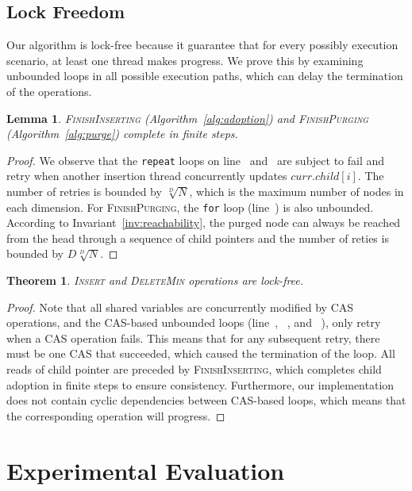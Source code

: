 \documentclass[10pt,journal,letterpaper,compsoc]{IEEEtran}
\newtheorem{theorem}{Theorem}
\newtheorem{lemma}{Lemma}
\begin{document}
\subsection{Lock Freedom}
Our algorithm is lock-free because it guarantee that for every possibly execution scenario, at least one thread makes progress.
We prove this by examining unbounded loops in all possible execution paths, which can delay the termination of the operations.
\begin{lemma} \label{lmm:finitestep}
    \textsc{FinishInserting} (Algorithm~\ref{alg:adoption}) and \textsc{FinishPurging} (Algorithm~\ref{alg:purge}) complete in finite steps.
\end{lemma}
\begin{proof}
    We observe that the \texttt{repeat} loops on line~ and~ are subject to fail and retry when another insertion thread concurrently updates $curr.child[i]$.
    The number of retries is bounded by $\sqrt[D]{N}$, which is the maximum number of nodes in each dimension.
    For \textsc{FinishPurging}, the \texttt{for} loop (line~) is also unbounded.
    According to Invariant~\ref{inv:reachability}, the purged node can always be reached from the head through a sequence of child pointers and the number of reties is bounded by $D \sqrt[D]{N}$.
\end{proof}

\begin{theorem}
    \textsc{Insert} and \textsc{DeleteMin} operations are lock-free.
\end{theorem}
\begin{proof}
    Note that all shared variables are concurrently modified by CAS operations, and the CAS-based unbounded loops (line~, ~, and ~), only retry when a CAS operation fails.
    This means that for any subsequent retry, there must be one CAS that succeeded, which caused the termination of the loop.
    All reads of child pointer are preceded by \textsc{FinishInserting}, which completes child adoption in finite steps to ensure consistency.
    Furthermore, our implementation does not contain cyclic dependencies between CAS-based loops, which means that the corresponding operation will progress.
\end{proof}

\section{Experimental Evaluation}
\label{sec:experiment}
\end{document}
